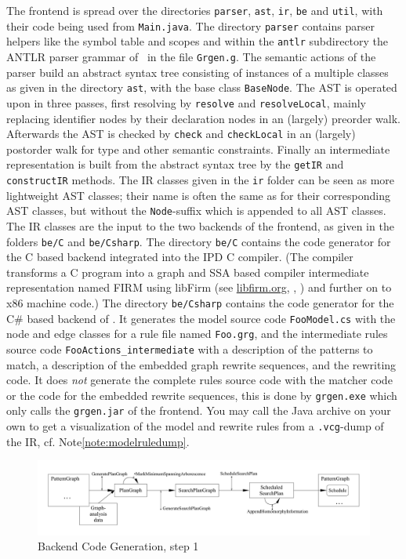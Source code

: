 The frontend is spread over the directories \texttt{parser}, \texttt{ast}, \texttt{ir}, \texttt{be} and \texttt{util}, with their code being used from \texttt{Main.java}.
The directory \texttt{parser} contains parser helpers like the symbol table and scopes and within the \texttt{antlr} subdirectory the ANTLR parser grammar of \GrG~in the file \texttt{Grgen.g}.
The semantic actions of the parser build an abstract syntax tree consisting of instances of a multiple classes as given in the directory \texttt{ast}, with the base class \texttt{BaseNode}.
The AST is operated upon in three passes, first resolving by \texttt{resolve} and \texttt{resolveLocal}, mainly replacing identifier nodes by their declaration nodes in an (largely) preorder walk.
Afterwards the AST is checked by \texttt{check} and \texttt{checkLocal} in an (largely) postorder walk for type and other semantic constraints.
Finally an intermediate representation is built from the abstract syntax tree by the \texttt{getIR} and \texttt{constructIR} methods.
The IR classes given in the \texttt{ir} folder can be seen as more lightweight AST classes; their name is often the same as for their corresponding AST classes, but without the \texttt{Node}-suffix which is appended to all AST classes.
The IR classes are the input to the two backends of the frontend, as given in the folders \texttt{be/C} and \texttt{be/Csharp}.
The directory \texttt{be/C} contains the code generator for the C based backend integrated into the IPD C compiler.
(The compiler transforms a C program into a graph and SSA based compiler intermediate representation named FIRM using libFirm (see \url{libfirm.org}, \cite{TBL:99}, \cite{Lin:02}) and further on to x86 machine code.)
The directory \texttt{be/Csharp} contains the code generator for the C\# based backend of \GrG. 
It generates the model source code \texttt{FooModel.cs} with the node and edge classes for a rule file named \texttt{Foo.grg}, 
and the intermediate rules source code \texttt{FooActions\_intermediate} with a description of the patterns to match, a description of the embedded graph rewrite sequences, and the rewriting code.
It does \emph{not} generate the complete rules source code with the matcher code or the code for the embedded rewrite sequences, this is done by \texttt{grgen.exe} which only calls the \texttt{grgen.jar} of the frontend.
You may call the Java archive on your own to get a visualization of the model and rewrite rules from a \texttt{.vcg}-dump of the IR, cf. Note\ref{note:modelruledump}.


\begin{figure}[htbp]
  \centering
  \includegraphics[width=\textwidth]{fig/AblaufCodeerzeugungBackend1}
  \caption{Backend Code Generation, step 1}
  \label{figbackendcodegen1}
\end{figure}

